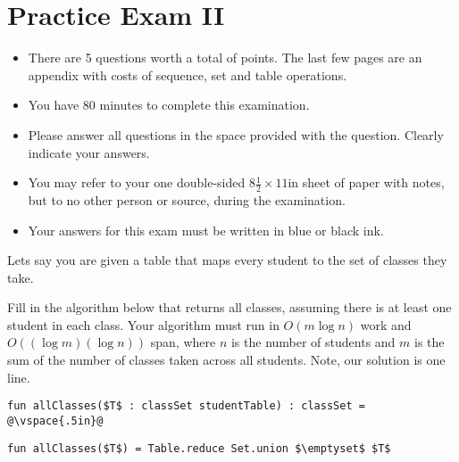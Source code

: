 \chapter{Practice Exam II}

\begin{preamble}
\newcommand{\numquestions}{5}

\begin{itemize}
\item There are \numquestions{} questions worth a total of \numpoints{} points.
  The last few pages are an appendix with costs of sequence,
  set and table operations.
\item You have 80 minutes to complete this examination.
\item Please answer all questions in the space provided with the
  question.  Clearly indicate your answers.
\item You may refer to your one double-sided $8\frac{1}{2} \times 11$in
  sheet of paper with notes, but to no other person or source, during the
  examination.

\item Your answers for this exam must be written in blue or black ink.

\end{itemize}
\end{preamble}

%



\begin{problem}[4p][Classes]



Lets say you are given a table that maps every student to the set of
classes they take. 

\answer
Fill in the algorithm below that returns all classes,
assuming there is at least one student in each class.  Your algorithm
must run in $O(m \log n)$ work and $O((\log m)(\log n))$ span, where
$n$ is the number of students and $m$ is the sum of the number of
classes taken across all students.    Note, our solution is one line.


\vspace{.3in}
\begin{lstlisting}[numbers=none]
fun allClasses($T$ : classSet studentTable) : classSet = 
@\vspace{.5in}@
\end{lstlisting}

\sol
\begin{lstlisting}[numbers=none]
fun allClasses($T$) = Table.reduce Set.union $\emptyset$ $T$
\end{lstlisting}

\end{problem}


